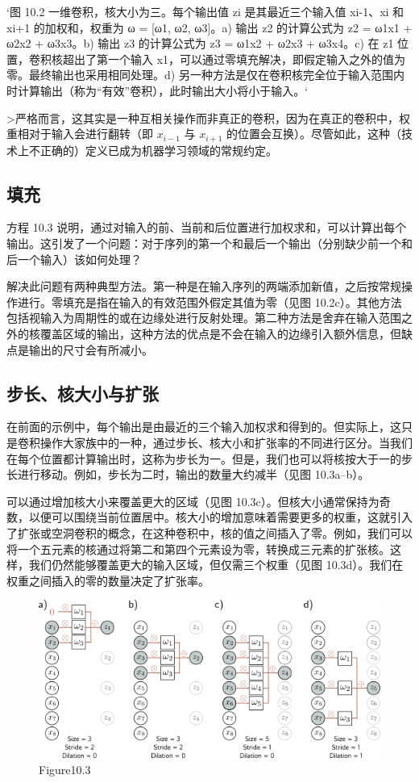 `图 10.2 一维卷积，核大小为三。每个输出值 zi 是其最近三个输入值 xi-1、xi 和 xi+1 的加权和，权重为 ω = [ω1, ω2, ω3]。a) 输出 z2 的计算公式为 z2 = ω1x1 + ω2x2 + ω3x3。b) 输出 z3 的计算公式为 z3 = ω1x2 + ω2x3 + ω3x4。c) 在 z1 位置，卷积核超出了第一个输入 x1，可以通过零填充解决，即假定输入之外的值为零。最终输出也采用相同处理。d) 另一种方法是仅在卷积核完全位于输入范围内时计算输出（称为“有效”卷积），此时输出大小将小于输入。`

>严格而言，这其实是一种互相关操作而非真正的卷积，因为在真正的卷积中，权重相对于输入会进行翻转（即 \(x_{i-1}\) 与 \(x_{i+1}\) 的位置会互换）。尽管如此，这种（技术上不正确的）定义已成为机器学习领域的常规约定。
\subsection{填充}
方程 10.3 说明，通过对输入的前、当前和后位置进行加权求和，可以计算出每个输出。这引发了一个问题：对于序列的第一个和最后一个输出（分别缺少前一个和后一个输入）该如何处理？

解决此问题有两种典型方法。第一种是在输入序列的两端添加新值，之后按常规操作进行。零填充是指在输入的有效范围外假定其值为零（见图 10.2c）。其他方法包括视输入为周期性的或在边缘处进行反射处理。第二种方法是舍弃在输入范围之外的核覆盖区域的输出，这种方法的优点是不会在输入的边缘引入额外信息，但缺点是输出的尺寸会有所减小。

\subsection{步长、核大小与扩张}
在前面的示例中，每个输出是由最近的三个输入加权求和得到的。但实际上，这只是卷积操作大家族中的一种，通过步长、核大小和扩张率的不同进行区分。当我们在每个位置都计算输出时，这称为步长为一。但是，我们也可以将核按大于一的步长进行移动。例如，步长为二时，输出的数量大约减半（见图 10.3a–b）。

可以通过增加核大小来覆盖更大的区域（见图 10.3c）。但核大小通常保持为奇数，以便可以围绕当前位置居中。核大小的增加意味着需要更多的权重，这就引入了扩张或空洞卷积的概念，在这种卷积中，核的值之间插入了零。例如，我们可以将一个五元素的核通过将第二和第四个元素设为零，转换成三元素的扩张核。这样，我们仍然能够覆盖更大的输入区域，但仅需三个权重（见图 10.3d）。我们在权重之间插入的零的数量决定了扩张率。


\begin{figure}[h!]
\centering
\includegraphics[width=0.7\linewidth]{png/chapter10/Conv1a.png}
\caption{Figure10.3}
\end{figure}

